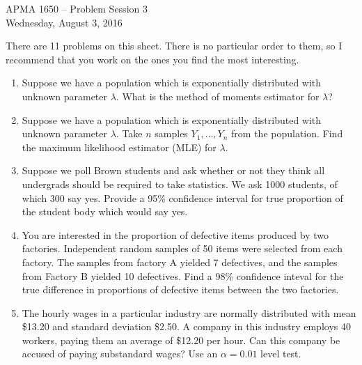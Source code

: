 \documentclass[12pt]{article}
\begin{document}
\title{}
\author{\vspace{-10ex} }

\begin{center}
{\LARGE APMA 1650 -- Problem Session 3}\\
\vspace{5mm}
{\large Wednesday, August 3, 2016}\\
\end{center}

There are 11 problems on this sheet. There is no particular order to them, so I recommend that you work on the ones you find the most interesting.

\begin{enumerate}

\item Suppose we have a population which is exponentially distributed with unknown parameter $\lambda$. What is the method of moments estimator for $\lambda$?

\item Suppose we have a population which is exponentially distributed with unknown parameter $\lambda$. Take $n$ samples $Y_1, \dots, Y_n$ from the population. Find the maximum likelihood estimator (MLE) for $\lambda$.

\item Suppose we poll Brown students and ask whether or not they think all undergrads should be required to take statistics. We ask 1000 students, of which 300 say yes. Provide a 95\% confidence interval for true proportion of the student body which would say yes.

\item You are interested in the proportion of defective items produced by two factories. Independent random samples of 50 items were selected from each factory. The samples from factory A yielded 7 defectives, and the samples from Factory B yielded 10 defectives. Find a 98\% confidence inteval for the true difference in proportions of defective items between the two factories.

\item The hourly wages in a particular industry are normally distributed with mean \$13.20 and standard deviation \$2.50. A company in this industry employs 40 workers, paying them an average of \$12.20 per hour. Can this company be accused of paying substandard wages? Use an $\alpha = 0.01$ level test. 


\end{enumerate}
\end{document}
